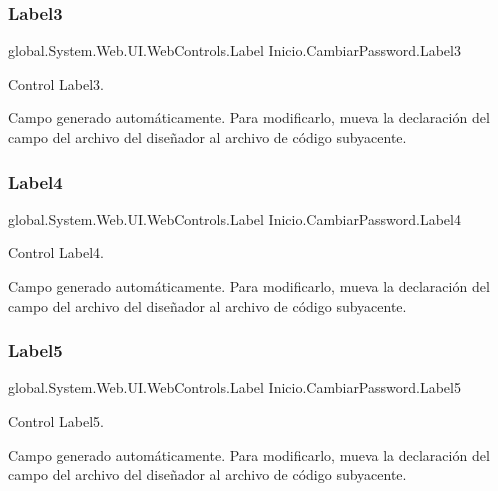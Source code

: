 \subsubsection{\texorpdfstring{Label3}{Label3}}
{\footnotesize\ttfamily global.\+System.\+Web.\+U\+I.\+Web\+Controls.\+Label Inicio.\+Cambiar\+Password.\+Label3\hspace{0.3cm}{\ttfamily [protected]}}



Control Label3. 

Campo generado automáticamente. Para modificarlo, mueva la declaración del campo del archivo del diseñador al archivo de código subyacente. \mbox{\label{classInicio_1_1CambiarPassword_a5c90deffe35773405ff5ec7a875eb035}} 
\subsubsection{\texorpdfstring{Label4}{Label4}}
{\footnotesize\ttfamily global.\+System.\+Web.\+U\+I.\+Web\+Controls.\+Label Inicio.\+Cambiar\+Password.\+Label4\hspace{0.3cm}{\ttfamily [protected]}}



Control Label4. 

Campo generado automáticamente. Para modificarlo, mueva la declaración del campo del archivo del diseñador al archivo de código subyacente. \mbox{\label{classInicio_1_1CambiarPassword_adabacc9becc23ab2219428532387a3b0}} 
\subsubsection{\texorpdfstring{Label5}{Label5}}
{\footnotesize\ttfamily global.\+System.\+Web.\+U\+I.\+Web\+Controls.\+Label Inicio.\+Cambiar\+Password.\+Label5\hspace{0.3cm}{\ttfamily [protected]}}



Control Label5. 

Campo generado automáticamente. Para modificarlo, mueva la declaración del campo del archivo del diseñador al archivo de código subyacente. \mbox{\label{classInicio_1_1CambiarPassword_a97691c6df6a8a92e71fe388ec90bd635}} 
